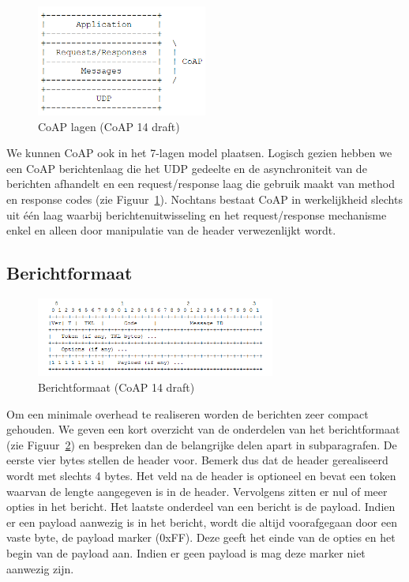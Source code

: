 \begin{figure}
\vspace{-10pt}
\includegraphics[width=0.5\textwidth]{fig/CoAPLaag}
\vspace{-30pt}
\caption{CoAP lagen (CoAP 14 draft)}
\vspace{-5pt}
\label{fig:CoAPLaag}
\end{figure}
We kunnen CoAP ook in het 7-lagen model plaatsen. Logisch gezien hebben we een CoAP berichtenlaag die het UDP gedeelte en de asynchroniteit van de berichten afhandelt en een request/response laag die gebruik maakt van method en response codes (zie Figuur~\ref{fig:CoAPLaag}). Nochtans bestaat CoAP in werkelijkheid slechts uit \'{e}\'{e}n laag waarbij berichtenuitwisseling en het request/response mechanisme enkel en alleen door manipulatie van de header verwezenlijkt wordt.

\subsection{Berichtformaat}

\begin{figure}
\vspace{-20pt}
\includegraphics[width=0.7\textwidth]{fig/CoAPMessageFormat}
\vspace{-30pt}
\caption{Berichtformaat (CoAP 14 draft)}
\vspace{-10pt}
\label{fig:CoAPMessageFormat}
\end{figure}
Om een minimale overhead te realiseren worden de berichten zeer compact gehouden. We geven een kort overzicht van de onderdelen van het berichtformaat (zie Figuur~\ref{fig:CoAPMessageFormat}) en bespreken dan de belangrijke delen apart in subparagrafen. De eerste vier bytes stellen de header voor. Bemerk dus dat de header gerealiseerd wordt met slechts 4 bytes. Het veld na de header is optioneel en bevat een token waarvan de lengte aangegeven is in de header. Vervolgens zitten er nul of meer opties in het bericht.
Het laatste onderdeel van een bericht is de payload. Indien er een payload aanwezig is in het bericht, wordt die altijd voorafgegaan door een vaste byte, de payload marker (0xFF). Deze geeft het einde van de opties en het begin van de payload aan. Indien er geen payload is mag deze marker niet aanwezig zijn.


